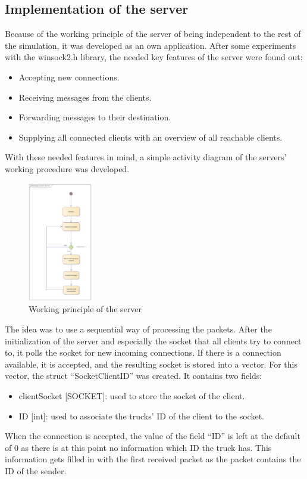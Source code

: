 \subsection{Implementation of the server}
Because of the working principle of the server of being independent to the rest of the simulation, it
was developed as an own application. After some experiments with the winsock2.h library, the needed key
features of the server were found out:
\begin{itemize}
    \item Accepting new connections.
    \item Receiving messages from the clients.
    \item Forwarding messages to their destination.
    \item Supplying all connected clients with an overview of all reachable clients.
\end{itemize}
With these needed features in mind, a simple activity diagram of the servers’ working procedure was
developed.
\begin{figure}[ht]
    \centering
    \includegraphics[width=0.25\textwidth]{images/comms_server_act.png}
    \caption{Working principle of the server}
    \label{img:comms_server_principle}
\end{figure}
The idea was to use a sequential way of processing the packets. After the initialization of the server
and especially the socket that all clients try to connect to, it polls the socket for new incoming
connections. If there is a connection available, it is accepted, and the resulting socket is stored into
a vector. For this vector, the struct “SocketClientID” was created. It contains two fields:
\begin{itemize}
    \item clientSocket [SOCKET]: used to store the socket of the client.
    \item ID [int]: used to associate the trucks’ ID of the client to the socket.
\end{itemize}
When the connection is accepted, the value of the field “ID” is left at the default of 0 as there is at
this point no information which ID the truck has. This information gets filled in with the first
received packet as the packet contains the ID of the sender.

